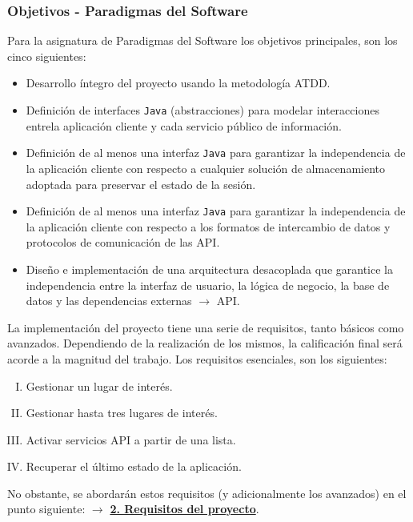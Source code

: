 \documentclass[../ei103948-project-documentation.tex]{subfiles}
\begin{document}
        \subsubsection{Objetivos - Paradigmas del Software}
        Para la asignatura de Paradigmas del Software los objetivos principales, son los cinco siguientes:
            \begin{itemize}
                \item Desarrollo íntegro del proyecto usando la metodología ATDD.
                \item Definición de interfaces \texttt{Java} (abstracciones) para modelar interacciones entrela aplicación cliente y cada servicio público de información.
                \item Definición de al menos una interfaz \texttt{Java} para garantizar la independencia de la aplicación cliente con respecto a cualquier solución de almacenamiento adoptada para preservar el estado de la sesión.
                \item Definición de al menos una interfaz \texttt{Java} para garantizar la independencia de la aplicación cliente con respecto a los formatos de intercambio de datos y protocolos de comunicación de las API.
                \item Diseño e implementación de una arquitectura desacoplada que garantice la independencia entre la interfaz de usuario, la lógica de negocio, la base de datos y las dependencias externas $\rightarrow$ API.
            \end{itemize}

    La implementación del proyecto tiene una serie de requisitos, tanto básicos como avanzados. Dependiendo de la realización de los mismos, la calificación final será acorde a la magnitud del trabajo. Los requisitos esenciales, son los siguientes:
    
            \begin{enumerate}[I.]
                \item Gestionar un lugar de interés.
                \item Gestionar hasta tres lugares de interés.
                \item Activar servicios API a partir de una lista.
                \item Recuperar el último estado de la aplicación.
            \end{enumerate}

    No obstante, se abordarán estos requisitos (y adicionalmente los avanzados) en el punto siguiente: $\rightarrow$ \underline{\textbf{2. Requisitos del proyecto}}.
\end{document}
